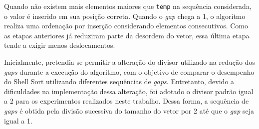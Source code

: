\quad Quando não existem mais elementos maiores que \texttt{temp} na
sequência considerada, o valor é inserido em sua posição correta. Quando
o \textit{gap} chega a 1, o algoritmo realiza uma ordenação por inserção
considerando elementos consecutivos. Como as etapas anteriores já
reduziram parte da desordem do vetor, essa última etapa tende a exigir
menos deslocamentos.

\quad Inicialmente, pretendia-se permitir a alteração do divisor utilizado
na redução dos \textit{gaps} durante a execução do algoritmo, com o objetivo
de comparar o desempenho do Shell Sort utilizando diferentes sequências de
\textit{gaps}. Entretanto, devido a dificuldades na implementação dessa
alteração, foi adotado o divisor padrão igual a 2 para os experimentos
realizados neste trabalho. Dessa forma, a sequência de \textit{gaps} é
obtida pela divisão sucessiva do tamanho do vetor por 2 até que o
\textit{gap} seja igual a 1.

